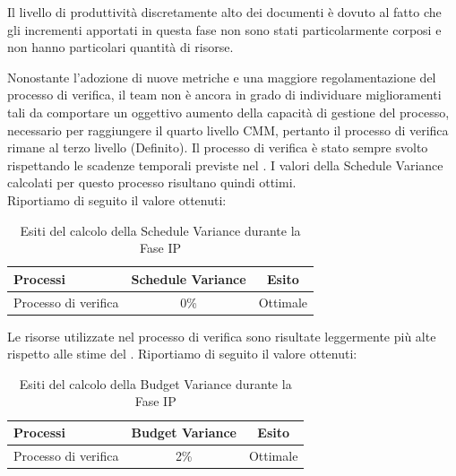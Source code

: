 	Il livello di produttività discretamente alto dei documenti è dovuto al fatto che gli incrementi apportati in questa fase non sono stati particolarmente corposi e non hanno particolari quantità di risorse.

		Nonostante l'adozione di nuove metriche e una maggiore regolamentazione del processo di verifica, il team non è ancora in grado di individuare miglioramenti tali da comportare un oggettivo aumento della capacità di gestione del processo, necessario per raggiungere il quarto livello CMM, pertanto il processo di verifica rimane al terzo livello (Definito).
		Il processo di verifica è stato sempre svolto rispettando le scadenze temporali previste nel . I valori della Schedule Variance calcolati per questo processo risultano quindi ottimi.\\
				Riportiamo di seguito il valore ottenuti:
				\begin{table}[H]
					\centering
					\begin{tabu}{| l | c | c |}
						\hline
							Processi 							& Schedule Variance	& Esito		\\ \hline \hline
							Processo di verifica & 0\% & Ottimale \\ \hline
					\end{tabu}
					\caption{Esiti del calcolo della Schedule Variance durante la Fase IP}
				\end{table}	

	Le risorse utilizzate nel processo di verifica sono risultate leggermente più alte rispetto alle stime del .
	Riportiamo di seguito il valore ottenuti:
	\begin{table}[H]
		\centering
		\begin{tabu}{| l | c | c |}
		\hline
		Processi 							& Budget Variance	& Esito		\\ \hline \hline
		Processo di verifica & 2\% & Ottimale \\ \hline
		\end{tabu}
		\caption{Esiti del calcolo della Budget Variance durante la Fase IP}
	\end{table}	

